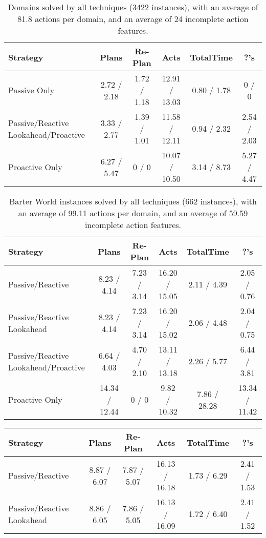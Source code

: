 \documentclass[letterpaper]{article}
\begin{document}
\begin{table*}\centering\begin{tabular}{|l|ccccc|}																					\hline
Strategy	&	Plans			&	Re-Plan			&	Acts			&	TotalTime			&	?'s			\\\hline
Passive Only	&	2.72	/	2.18	&	1.72	/	1.18	&	12.91	/	13.03	&	0.80	/	1.78	&	0	/	0	\\
Passive/Reactive Lookahead/Proactive	&	3.33	/	2.77	&	1.39	/	1.01	&	11.58	/	12.11	&	0.94	/	2.32	&	2.54	/	2.03	\\
Proactive Only	&	6.27	/	5.47	&	0	/	0	&	10.07	/	10.50	&	3.14	/	8.73	&	5.27	/	4.47	\\\hline
\end{tabular}\caption{\label{tab:t2}Domains solved by all techniques (3422
instances), with an average of 81.8 actions per domain, and an average of 24 incomplete action features.}\end{table*} \begin{table*}\centering\begin{tabular}{|l|ccccc|}\hline																					
Strategy	&	Plans			&	Re-Plan			&	Acts			&	TotalTime			&	?'s			\\\hline
Passive/Reactive	&	8.23	/	4.14	&	7.23	/	3.14	&	16.20	/	15.05	&	2.11	/	4.39	&	2.05	/	0.76	\\
Passive/Reactive Lookahead	&	8.23	/	4.14	&	7.23	/	3.14	&	16.20	/	15.02	&	2.06	/
4.48	&	2.04	/	0.75	\\ 
Passive/Reactive Lookahead/Proactive	&	6.64	/	4.03	&	4.70
/	2.10	&	13.11	/	13.18	&	2.26	/	5.77	&	6.44	/	3.81	\\ 
Proactive Only	&	14.34	/	12.44	&	0	/	0	&	9.82	/	10.32	&	7.86	/	28.28	&	13.34	/	11.42	\\\hline
\end{tabular}\caption{\label{tab:t3}Barter World instances solved by all
techniques (662 instances), with an average of 99.11 actions per domain, and an average of 59.59 incomplete action features.}\end{table*} \begin{table*}\centering\begin{tabular}{|l|ccccc|}\hline																					
Strategy	&	Plans			&	Re-Plan			&	Acts			&	TotalTime			&	?'s			\\\hline

Passive/Reactive	&	8.87	/	6.07	&	7.87	/	5.07	&	16.13	/	16.18	&	1.73	/	6.29	&	2.41	/	1.53	\\

Passive/Reactive Lookahead	&	8.86	/	6.05	&	7.86	/	5.05	&	16.13	/	16.09	&	1.72	/
6.40	&	2.41	/	1.52	\\ 


\end{tabular}
\end{table*}
\end{document}

